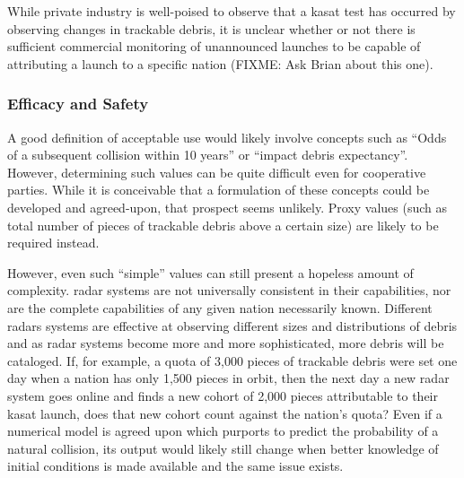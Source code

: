 While private industry is well-poised to observe that a \ac{kasat}
test has occurred by observing changes in trackable debris, it is
unclear whether or not there is sufficient commercial monitoring of
unannounced launches to be capable of attributing a launch to a
specific nation (FIXME: Ask Brian about this one).

\subsubsection{Efficacy and Safety}
A good definition of acceptable use would likely involve concepts such
as ``Odds of a subsequent collision within 10 years'' or ``impact
debris expectancy''.\cite[p19]{italiano} However, determining such
values can be quite difficult even for cooperative
parties.\cite[p18]{italiano} While it is conceivable that a
formulation of these concepts could be developed and agreed-upon, that
prospect seems unlikely.  Proxy values (such as total number of pieces
of trackable debris above a certain size) are likely to be required
instead.

However, even such ``simple'' values can still present a hopeless
amount of complexity.  \ac{radar} systems are not universally
consistent in their capabilities\cite[needed?]{xxx}, nor are the
complete capabilities of any given nation necessarily
known.\cite[needed?]{xxx} Different \acp{radar} systems are effective
at observing different sizes and distributions of debris and as
\ac{radar} systems become more and more sophisticated, more debris
will be cataloged.  If, for example, a quota of 3,000 pieces of
trackable debris were set one day when a nation has only 1,500 pieces
in orbit, then the next day a new \ac{radar} system goes online and
finds a new cohort of 2,000 pieces attributable to their \ac{kasat}
launch, does that new cohort count against the nation's quota?  Even
if a numerical model is agreed upon which purports to predict the
probability of a natural collision, its output would likely still
change when better knowledge of initial conditions is made available
and the same issue exists.

